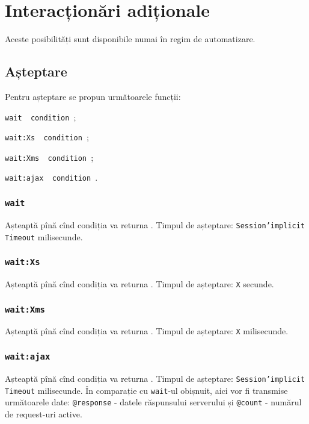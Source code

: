 \section{Interacționări adiționale}

Aceste posibilități sunt disponibile numai în regim de automatizare.

\subsection{Așteptare}

Pentru așteptare se propun următoarele funcții:
\begin{icItems}
	\item \texttt{wait { condition }};
	\item \texttt{wait:Xs { condition }};
	\item \texttt{wait:Xms { condition }};
	\item \texttt{wait:ajax { condition }}.
\end{icItems}

\subsubsection{\texttt{wait}}

Așteaptă pînă cînd condiția va returna \true. Timpul de așteptare: \texttt{Session'implicit\- Timeout} milisecunde. 

\subsubsection{\texttt{wait:Xs}}

Așteaptă pînă cînd condiția va returna \true. Timpul de așteptare: \texttt{X} secunde. 

\subsubsection{\texttt{wait:Xms}}

Așteaptă pînă cînd condiția va returna \true. Timpul de așteptare: \texttt{X} milisecunde. 

\subsubsection{\texttt{wait:ajax}}

Așteaptă pînă cînd condiția va returna \true. Timpul de așteptare: \texttt{Session'implicit\- Timeout} milisecunde. În comparație cu \texttt{wait}-ul obișnuit, aici vor fi transmise următoarele date: \texttt{@response} - datele răspunsului serverului și \texttt{@count} - numărul de request-uri active.

